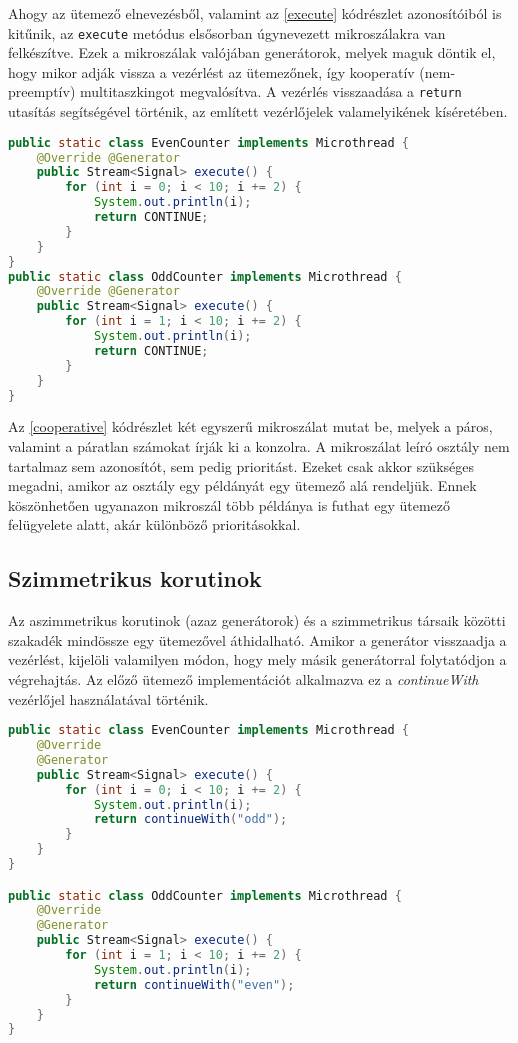 Ahogy az ütemező elnevezésből, valamint az \ref{execute} kódrészlet azonosítóiból is kitűnik, az \texttt{execute} metódus elsősorban úgynevezett mikroszálakra van felkészítve. Ezek a mikroszálak valójában generátorok, melyek maguk döntik el, hogy mikor adják vissza a vezérlést az ütemezőnek, így kooperatív (nem-preemptív) multitaszkingot megvalósítva. A vezérlés visszaadása a \texttt{return} utasítás segítségével történik, az említett vezérlőjelek valamelyikének kíséretében.

\begin{lstlisting}[language=Java, caption={Kooperatív mikroszálak}, escapechar=!, captionpos=b, aboveskip=1em, label=cooperative]
public static class EvenCounter implements Microthread {
    @Override @Generator
    public Stream<Signal> execute() {
        for (int i = 0; i < 10; i += 2) {
            System.out.println(i);
            return CONTINUE;
        }
    }
}
public static class OddCounter implements Microthread {
    @Override @Generator
    public Stream<Signal> execute() {
        for (int i = 1; i < 10; i += 2) {
            System.out.println(i);
            return CONTINUE;
        }
    }
}
\end{lstlisting} 

Az \ref{cooperative} kódrészlet két egyszerű mikroszálat mutat be, melyek a páros, valamint a páratlan számokat írják ki a konzolra. A mikroszálat leíró osztály nem tartalmaz sem azonosítót, sem pedig prioritást. Ezeket csak akkor szükséges megadni, amikor az osztály egy példányát egy ütemező alá rendeljük. Ennek köszönhetően ugyanazon mikroszál több példánya is futhat egy ütemező felügyelete alatt, akár különböző prioritásokkal.

\subsection{Szimmetrikus korutinok}

Az aszimmetrikus korutinok (azaz generátorok) és a szimmetrikus társaik közötti szakadék mindössze egy ütemezővel áthidalható. Amikor a generátor visszaadja a vezérlést, kijelöli valamilyen módon, hogy mely másik generátorral folytatódjon a végrehajtás. Az előző ütemező implementációt alkalmazva ez a \textit{continueWith} vezérlőjel használatával történik.

\begin{lstlisting}[language=Java, caption={Számlálás szimmetrikus korutinokkal}, escapechar=!, captionpos=b, aboveskip=1em, label=symmetric]
public static class EvenCounter implements Microthread {
    @Override
    @Generator
    public Stream<Signal> execute() {
        for (int i = 0; i < 10; i += 2) {
            System.out.println(i);
            return continueWith("odd");
        }
    }
}

public static class OddCounter implements Microthread {
    @Override
    @Generator
    public Stream<Signal> execute() {
        for (int i = 1; i < 10; i += 2) {
            System.out.println(i);
            return continueWith("even");
        }
    }
}
\end{lstlisting} 

